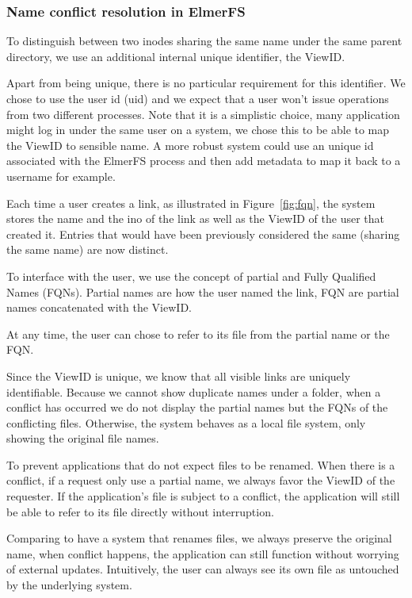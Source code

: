 \documentclass[sigconf, anonymous, 10pt]{acmart}
\begin{document}
\subsubsection{Name conflict resolution in ElmerFS}

To distinguish between two inodes sharing the same name under the same parent directory, we use an additional internal unique identifier, the ViewID.

Apart from being unique, there is no particular requirement for this identifier.
We chose to use the user id (uid) and we expect that a user won’t issue operations
from two different processes. Note that it is a simplistic choice, many application might
log in under the same user on a system, we chose this to be able to map the ViewID to
sensible name. A more robust system could use an unique id associated with the ElmerFS process and then add metadata
to map it back to a username for example.

Each time a user creates a link, as illustrated in Figure~\ref{fig:fqn},
the system stores the name and the ino of the link as well as the ViewID of the user that created it.
Entries that would have been previously considered the same (sharing the same name) are now distinct.

To interface with the user, we use the concept of partial and Fully Qualified Names (FQNs).
Partial names are how the user named the link, FQN are partial names concatenated with the ViewID.

At any time, the user can chose to refer to its file from the partial name or the FQN.

Since the ViewID is unique, we know that all visible links are uniquely identifiable.
Because we cannot show duplicate names under a folder, when a conflict has occurred we do not display the partial names
but the FQNs of the conflicting files. Otherwise, the system behaves as a local file system, only showing the original file names.

To prevent applications that do not expect files to be renamed. When there is a conflict, if a request only use a partial name, we always favor the ViewID of the requester. If the application's file is subject to a conflict, the application will
still be able to refer to its file directly without interruption.

Comparing to have a system that renames files, we always preserve the original name, when conflict happens, the application can still function without worrying of external updates. Intuitively, the user can always see its own file as untouched by the underlying system.
\end{document}
